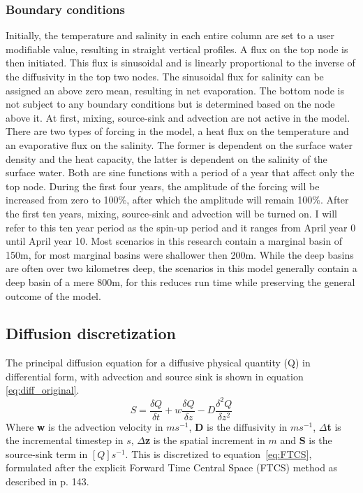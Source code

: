 \documentclass[twocolumn]{article}
\begin{document}
\subsubsection{Boundary conditions}
\label{sect:boundary_conditions}
Initially, the temperature and salinity in each entire column are set to a user modifiable value, resulting in straight vertical profiles. A flux on the top node is then initiated. This flux is sinusoidal and is linearly proportional to the inverse of the diffusivity in the top two nodes. The sinusoidal flux for salinity can be assigned an above zero mean, resulting in net evaporation. The bottom node is not subject to any boundary conditions but is determined based on the node above it. At first, mixing, source-sink and advection are not active in the model.
There are two types of forcing in the model, a heat flux on the temperature and an evaporative flux on the salinity. The former is dependent on the surface water density and the heat capacity, the latter is dependent on the salinity of the surface water. Both are sine functions with a period of a year that affect only the top node.
During the first four years, the amplitude of the forcing will be increased from zero to 100$\%$, after which the amplitude will remain 100$\%$. After the first ten years, mixing, source-sink and advection will be turned on. I will refer to this ten year period as the spin-up period and it ranges from April year 0 until April year 10. Most scenarios in this research contain a marginal basin of 150m, for most marginal basins were shallower then 200m. While the deep basins are often over two kilometres deep, the scenarios in this model generally contain a deep basin of a mere 800m, for this reduces run time while preserving the general outcome of the model. %

\subsection{Diffusion discretization}
The principal diffusion equation for a diffusive physical quantity (Q) in differential form, with advection and source sink is shown in equation \ref{eq:diff_original}.
\begin{equation}
    S = \frac{\delta Q}{\delta t} + w\frac{\delta Q}{\delta z} - D\frac{\delta^2 Q}{\delta z^2}
\label{eq:diff_original}
\end{equation}
Where \textbf{w} is the advection velocity in $m s^{-1}$, \textbf{D} is the diffusivity in $ms^{-1}$, $\Delta$\textbf{t} is the incremental timestep in $s$, $\Delta$\textbf{z} is the spatial increment in $m$ and \textbf{S} is the source-sink term in $[Q]s^{-1}$.  
This is discretized to equation~\ref{eq:FTCS}, formulated after the explicit Forward Time Central Space (FTCS) method as described in \cite{slingerland2011mathematical} p. 143.
\end{document}
